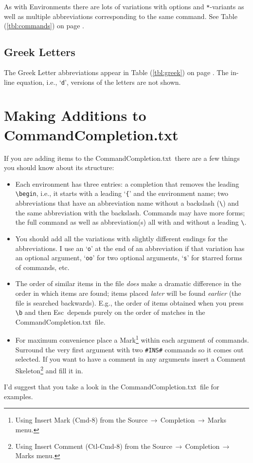 \documentclass[11pt]{article}
\newcommand{\ctlkey}{\textsf{Ctl}}
\newcommand{\cmdkey}{\textsf{Cmd}}
\newcommand{\esckey}{\textsf{Esc}}
\newcommand{\mnu}[1]{\textsf{#1}}
\newcommand{\To}{\,\(\to\)\,}
\newcommand{\CCT}{\textsf{CommandCompletion.txt}}
\begin{document}
As with Environments there are lots of variations with options and \texttt{*}-variants as well as multiple abbreviations corresponding to the same command. See Table (\ref{tbl:commands}) on page \pageref{tbl:commands}.

\subsection*{Greek Letters}

The Greek Letter abbreviations appear in Table (\ref{tbl:greek}) on page \pageref{tbl:greek}. The in-line equation, i.e., `\texttt{d}', versions of the letters are not shown.

\section*{Making Additions to \CCT}

If you are adding items to the \CCT\ there are a few things you should know about its structure:
\begin{itemize}
\item
Each environment has three entries: a completion that removes the leading \verb|\begin|, i.e., it starts with a leading `\texttt{\{}' and the environment name; two abbreviations that have an abbreviation name without a backslash (\verb|\|) and the same abbreviation with the backslash. Commands may have more forms; the full command as well as abbreviation(s) all with and without a leading \verb|\|.
\item
You should add all the variations with slightly different endings for the abbreviations. I use an `\texttt{o}' at the end of an abbreviation if that variation has an optional argument, `\texttt{oo}' for two optional arguments, `\texttt{s}' for \texttt{s}tarred forms of commands, etc.
\item
The order of similar items in the file \emph{does} make a dramatic difference in the order in which items are found; items placed \emph{later} will be found \emph{earlier} (the file is searched backwards). E.g., the order of items obtained when you press \verb|\b| and then \esckey\ depends purely on the order of matches in the \CCT\ file.
\item
For maximum convenience place a Mark\footnote{Using \mnu{Insert Mark} (\cmdkey-\textsf{8}) from the \mnu{Source}\To\mnu{Completion}\To\mnu{Marks} menu.} within each argument of commands. Surround the very first argument with two \verb|#INS#| commands so it comes out selected. If you want to have a comment in any arguments insert a Comment Skeleton\footnote{Using \mnu{Insert Comment} (\ctlkey-\cmdkey-\textsf{8}) from the \mnu{Source}\To\mnu{Completion}\To\mnu{Marks} menu.} and fill it in.
\end{itemize}
I'd suggest that you take a look in the \CCT\ file for examples.
\end{document}
